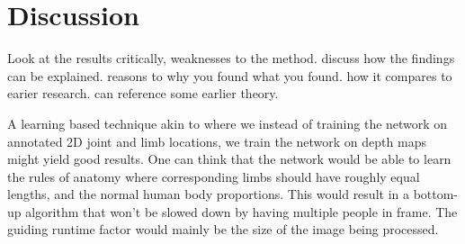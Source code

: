 \section{Discussion}
{\color{red}Look at the results critically, weaknesses to the method. discuss how the findings can be explained. reasons to why you found what you found. how it compares to earier research. can reference some earlier theory.}

A learning based technique akin to \cite{cao2017realtime} where we instead of training the network on annotated 2D joint and limb locations, we train the network on depth maps might yield good results. One can think that the network would be able to learn the rules of anatomy where corresponding limbs should have roughly equal lengths, and the normal human body proportions. This would result in a bottom-up algorithm that won't be slowed down by having multiple people in frame. The guiding runtime factor would mainly be the size of the image being processed.


